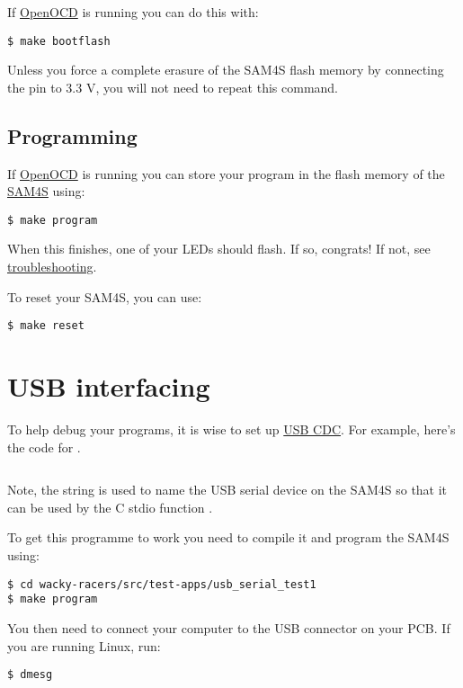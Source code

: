 If \url{OpenOCD} is running you can do this with:

\begin{verbatim}
$ make bootflash
\end{verbatim}

Unless you force a complete erasure of the SAM4S flash memory by
connecting the  pin to 3.3 V, you will not need to repeat
this command.

\subsection{Programming}
\label{programming}

If \url{OpenOCD} is running you can store your program in the flash
memory of the \url{SAM4S} using:

\begin{verbatim}
$ make program
\end{verbatim}

When this finishes, one of your LEDs should flash. If so, congrats! If
not, see \protect\hyperref[troubleshooting]{troubleshooting}.

To reset your SAM4S, you can use:
%
\begin{verbatim}
$ make reset
\end{verbatim}

\section{USB interfacing}
\label{usb-interfacing}

To help debug your programs, it is wise to set up \href{USB_CDC}{USB
CDC}. For example, here's the code for
.

\inputminted{C}{../../src/test-apps/usb_serial_test1/usb_serial_test1.c}

Note, the string  is used to name the USB serial
device on the SAM4S so that it can be used by the C stdio function
.   

To get this programme to work you need to compile it and program the SAM4S using:

\begin{verbatim}
$ cd wacky-racers/src/test-apps/usb_serial_test1
$ make program
\end{verbatim}

You then need to connect your computer to the USB connector on your PCB.
If you are running Linux, run:
%
\begin{verbatim}
$ dmesg
\end{verbatim}

